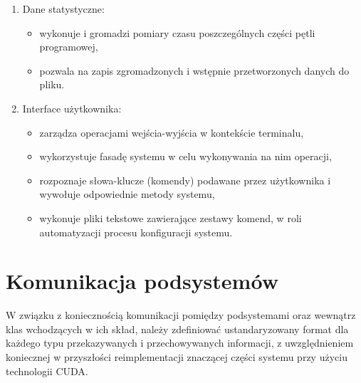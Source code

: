 \begin{enumerate}
    \item Dane statystyczne:
        \begin{itemize}
            \item wykonuje i gromadzi pomiary czasu poszczególnych części pętli programowej,
            \item pozwala na zapis zgromadzonych i wstępnie przetworzonych danych do pliku.
        \end{itemize}
    \item Interface użytkownika:
        \begin{itemize}
            \item zarządza operacjami wejścia-wyjścia w kontekście terminalu,
            \item wykorzystuje fasadę systemu w celu wykonywania na nim operacji,
            \item rozpoznaje słowa-klucze (komendy) podawane przez użytkownika i wywołuje odpowiednie metody systemu,
            \item wykonuje pliki tekstowe zawierające zestawy komend, w roli automatyzacji procesu konfiguracji systemu.
        \end{itemize}
\end{enumerate}

\section{Komunikacja podsystemów}
W związku z koniecznością komunikacji pomiędzy podsystemami oraz wewnątrz klas wchodzących w ich skład, należy zdefiniować ustandaryzowany format dla każdego typu przekazywanych i przechowywanych informacji, z uwzględnieniem koniecznej w przyszłości reimplementacji znaczącej części systemu przy użyciu technologii CUDA.

